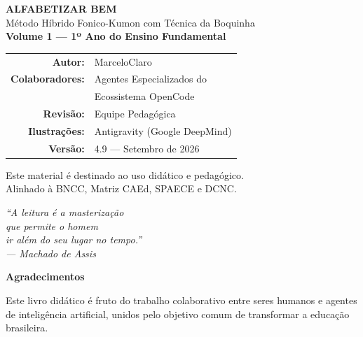 \documentclass{alfabetizar}
\begin{document}

\thispagestyle{empty}
\begin{center}
\vspace*{3cm}
{\Large\bfseries\color{primary} ALFABETIZAR BEM}\\[1em]
{\large Método Híbrido Fonico-Kumon com Técnica da Boquinha}\\[2em]
{\normalsize\textbf{Volume 1 --- 1º Ano do Ensino Fundamental}}\\[3em]
\begin{tabular}{rl}
\textbf{Autor:} & MarceloClaro \\[0.5em]
\textbf{Colaboradores:} & Agentes Especializados do \\[0.2em]
 & Ecossistema OpenCode \\[0.5em]
\textbf{Revisão:} & Equipe Pedagógica \\[0.5em]
\textbf{Ilustrações:} & Antigravity (Google DeepMind) \\[0.5em]
\textbf{Versão:} & 4.9 --- Setembro de 2026 \\
\end{tabular}
\vfill
{\small\color{secondary}
Este material é destinado ao uso didático e pedagógico.\\
Alinhado à BNCC, Matriz CAEd, SPAECE e DCNC.
}
\end{center}
\clearpage

\thispagestyle{empty}
\vspace*{5cm}
\begin{center}
\textit{\large``A leitura é a masterização\\que permite o homem\\ir além do seu lugar no tempo.''\\[1em]
--- Machado de Assis}
\end{center}
\clearpage

\thispagestyle{empty}
\begin{center}
\vspace*{2cm}
{\Large\bfseries\color{primary} Agradecimentos}
\end{center}
\vspace{1em}

Este livro didático é fruto do trabalho colaborativo entre seres humanos e agentes de inteligência artificial, unidos pelo objetivo comum de transformar a educação brasileira.
\end{document}

